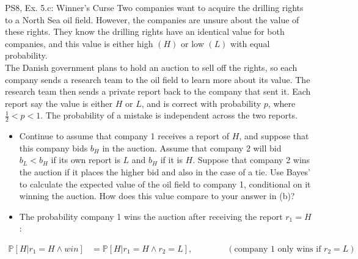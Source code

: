 \begin{frame}{PS8, Ex. 5.c: Winner's Curse}
      Two companies want to acquire the drilling rights to a North Sea oil field. However, the companies are unsure about the value of these rights. They know the drilling rights have an identical value for both companies, and this value is either high $(H)$ or low $(L)$ with equal probability.\\\smallskip
      The Danish government plans to hold an auction to sell off the rights, so each company sends a research team to the oil field to learn more about its value. The research team then sends a private report back to the company that sent it. Each report say the value is either $H$ or $L$, and is correct with probability $p$, where $\frac{1}{2} < p < 1$. The probability of a mistake is independent across the two reports.
      \vspace{-2pt}
      \begin{itemize}
        \item[(c)] Continue to assume that company 1 receives a report of $H$, and suppose that this company bids $b_H$ in the auction. Assume that company 2 will bid $b_L < b_H$ if its own report is $L$ and $b_H$ if it is $H$. Suppose that company 2 wins the auction if it places the higher bid and also in the case of a tie. Use Bayes’ to calculate the expected value of the oil field to company 1, conditional on it winning the auction. How does this value compare to your answer in (b)?
        \item[Step 1:] The probability company 1 wins the auction after receiving the report $r_1=H$:
        \end{itemize}
        \vspace{-8pt}
        \begin{align*}
          \mathbb{P}[H|r_1=H\wedge win]&=\mathbb{P}[H|r_1=H\wedge r_2=L],\quad\quad\quad\quad(\text{company 1 only wins if }r_2=L)
        \end{align*}
      \vfill\null
\end{frame}
